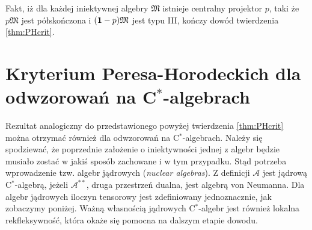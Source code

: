 Fakt, iż dla każdej iniektywnej algebry $\mathfrak{M}$
istnieje centralny projektor $p$, taki że $p\mathfrak{M}$
jest półskończona i $({\bf 1}-p)\mathfrak{M}$ jest typu III,
kończy dowód twierdzenia \ref{thm:PHcrit}.


\section{Kryterium Peresa-Horodeckich dla odwzorowań na C$^*$-algebrach}
\label{sec:HorCstar}
Rezultat analogiczny do przedstawionego powyżej twierdzenia \ref{thm:PHcrit}
można otrzymać również dla odwzorowań na C$^*$-algebrach.
Należy się spodziewać, że poprzednie założenie o iniektywności jednej z
algebr będzie musiało zostać w jakiś sposób zachowane i w tym przypadku.
Stąd potrzeba wprowadzenie tzw. algebr jądrowych (\emph{nuclear algebras}).
Z definicji $\mathcal{A}$ jest jądrową C$^{*}$-algebrą,
jeżeli $\mathcal{A}^{**}$, druga przestrzeń dualna,
jest algebrą von Neumanna.
Dla algebr jądrowych iloczyn tensorowy jest zdefiniowany jednoznacznie,
jak zobaczymy poniżej.
Ważną własnością jądrowych C$^{*}$-algebr jest również lokalna rekfleksywność,
która okaże się pomocna na dalszym etapie dowodu.

